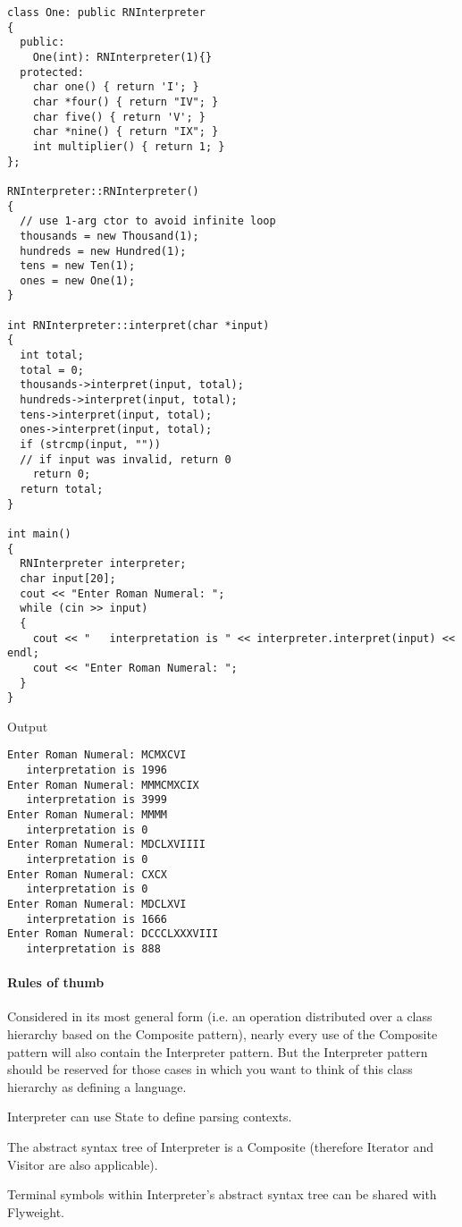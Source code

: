 \documentclass{book}
\begin{document}
\begin{lstlisting}
class One: public RNInterpreter
{
  public:
    One(int): RNInterpreter(1){}
  protected:
    char one() { return 'I'; }
    char *four() { return "IV"; }
    char five() { return 'V'; }
    char *nine() { return "IX"; }
    int multiplier() { return 1; }
};

RNInterpreter::RNInterpreter()
{
  // use 1-arg ctor to avoid infinite loop
  thousands = new Thousand(1);
  hundreds = new Hundred(1);
  tens = new Ten(1);
  ones = new One(1);
}

int RNInterpreter::interpret(char *input)
{
  int total;
  total = 0;
  thousands->interpret(input, total);
  hundreds->interpret(input, total);
  tens->interpret(input, total);
  ones->interpret(input, total);
  if (strcmp(input, ""))
  // if input was invalid, return 0
    return 0;
  return total;
}

int main()
{
  RNInterpreter interpreter;
  char input[20];
  cout << "Enter Roman Numeral: ";
  while (cin >> input)
  {
    cout << "   interpretation is " << interpreter.interpret(input) << endl;
    cout << "Enter Roman Numeral: ";
  }
}
\end{lstlisting}
Output
\begin{verbatim}
Enter Roman Numeral: MCMXCVI
   interpretation is 1996
Enter Roman Numeral: MMMCMXCIX
   interpretation is 3999
Enter Roman Numeral: MMMM
   interpretation is 0
Enter Roman Numeral: MDCLXVIIII
   interpretation is 0
Enter Roman Numeral: CXCX
   interpretation is 0
Enter Roman Numeral: MDCLXVI
   interpretation is 1666
Enter Roman Numeral: DCCCLXXXVIII
   interpretation is 888
\end{verbatim}

\paragraph{ Rules of thumb}

Considered in its most general form (i.e. an operation distributed over a class hierarchy based on the Composite pattern),
nearly every use of the Composite pattern will also contain the Interpreter pattern.
But the Interpreter pattern should be reserved for those cases in which you want to think of this class hierarchy as defining a language.

Interpreter can use State to define parsing contexts.

The abstract syntax tree of Interpreter is a Composite (therefore Iterator and Visitor are also applicable).

Terminal symbols within Interpreter's abstract syntax tree can be shared with Flyweight.
\end{document}
